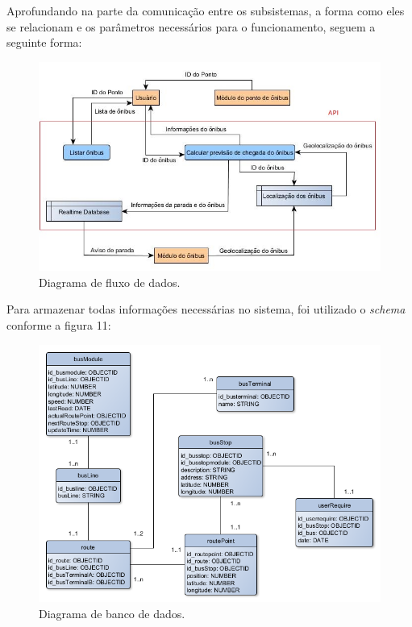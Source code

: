 \documentclass[
	12pt,				%
	oneside,			%
	a4paper,			%
	brazil				%
]{abntex2}
\begin{document}
{Aprofundando na parte da comunicação entre os subsistemas, a forma como eles se relacionam e os parâmetros necessários para o funcionamento, seguem a seguinte forma:

\begin{figure}[H]
\centering
\includegraphics[width=15cm, center]{images/data-flux.jpg}
\caption{Diagrama de fluxo de dados.}
\label{Rotulo}
\end{figure}

\newpage

Para armazenar todas informações necessárias no sistema, foi utilizado o \textit{schema} conforme a figura 11:

\begin{figure}[H]
\centering
\includegraphics[width=15cm, center]{images/database-api.png}
\caption{Diagrama de banco de dados.}
\label{Rotulo}
\end{figure}

}
\end{document}
